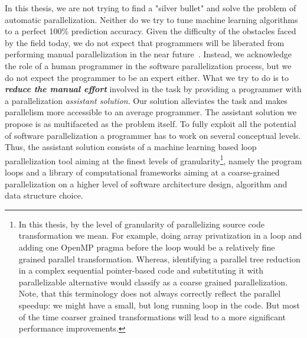 \quad In this thesis, we are not trying to find a "silver bullet" and solve the problem of automatic parallelization. Neither do we try to tune machine learning algorithms to a perfect 100\% prediction accuracy. Given the difficulty of the obstacles faced by the field today, we do not expect that programmers will be liberated from performing manual parallelization in the near future~\cite{Larsen:2012:PML:2410141.2410600}. Instead, we acknowledge the role of a human programmer in the software parallelization process, but we do not expect the programmer to be an expert either. What we try to do is to \textit{\textbf{reduce the manual effort}} involved in the task by providing a programmer with a parallelization \textit{assistant solution}. Our solution alleviates the task and makes parallelism more accessible to an average programmer. The assistant solution we propose is as multifaceted as the problem itself. To fully exploit all the potential of software parallelization a programmer has to work on several conceptual levels. Thus, the assistant solution consists of a machine learning based loop parallelization tool \cite{assistant-aiseps} aiming at the finest levels of granularity\footnote{In this thesis, by the level of granularity of parallelizing source code transformation we mean. For example, doing array privatization in a loop and adding one OpenMP pragma before the loop would be a relatively fine grained parallel transformation. Whereas, identifying a parallel tree reduction in a complex sequential pointer-based code and substituting it with parallelizable alternative would classify as a coarse grained parallelization. Note, that this terminology does not always correctly reflect the parallel speedup: we might have a small, but long running loop in the code. But most of the time coarser grained transformations will lead to a more significant performance improvements.}, namely the program loops and a library of computational frameworks \cite{frameworks-repo} aiming at a coarse-grained parallelization on a higher level of software architecture design, algorithm and data structure choice.
